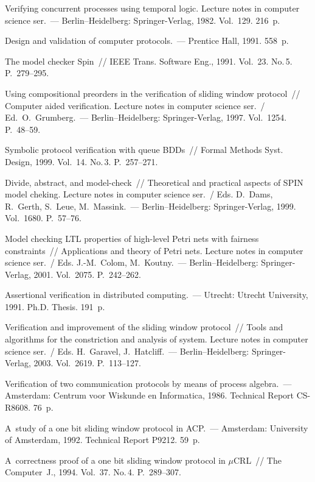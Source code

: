 \begin{multicols}{2}
{{\begin{thebibliography}{99}
 Verifying concurrent processes using temporal
logic. Lecture notes in computer science ser.~---
Berlin--Heidelberg: Springer-Verlag,  1982. Vol.~129.
216~p.

 Design and validation of computer protocols.~---
Prentice Hall, 1991. 558~p.

 The model checker Spin~// IEEE
Trans. Software Eng., 1991. Vol.~23. No.\,5. P.~279--295.

 Using compositional preorders in the verification
of sliding window protocol~// Computer aided verification.
Lecture notes in computer
science ser.~/ Ed.\ O.~Grumberg.~--- Berlin--Heidelberg:
Springer-Verlag, 1997. Vol.~1254. P.~48--59.

 Symbolic protocol verification with
queue BDDs~// Formal Methods  Syst. Design, 1999.
Vol.~14. No.\,3. P.~257--271.

 Divide, abstract,
and model-check~// Theoretical and practical aspects of SPIN model
cheking. Lecture notes in computer science ser.~/
Eds. D.~Dams, R.~Gerth, S.~Leue, M.~Massink.~--- Berlin--Heidelberg:
Springer-Verlag, 1999. Vol.~1680. P.~57--76.

 Model checking LTL properties of high-level Petri
nets with fairness constraints~// Applications and theory of Petri nets.
Lecture notes in computer science ser.~/ Eds. J.-M.~Colom, M.~Koutny.~---
Berlin--Heidelberg: Springer-Verlag, 2001. Vol.~2075. P.~242--262.

 Assertional verification in distributed computing.~---
Utrecht: Utrecht University, 1991. Ph.D. Thesis. 191~p.

 Verification and
improvement of the sliding window protocol~// Tools and algorithms for the constriction
and analysis of system. {Lecture notes
in computer science ser.}~/
Eds. H.~Garavel, J.~Hatcliff.~--- Berlin--Heidelberg: Springer-Verlag, 2003.
Vol.~2619. P.~113--127.

 Verification of two communication protocols by
means of process algebra.~--- Amsterdam:
Centrum voor Wiskunde en Informatica, 1986.  Technical Report CS-R8608. 76~p.

 A~study of a one bit sliding window protocol in
ACP.~---  Amsterdam: University of Amsterdam,
1992. Technical Report P9212. 59~p.

 A~correctness proof of a one bit sliding
window protocol in $\mu$CRL~// {The Computer~J.}, 1994.
Vol.~37. No.\,4. P.~289--307.

\end{thebibliography}
} }

\end{multicols}

